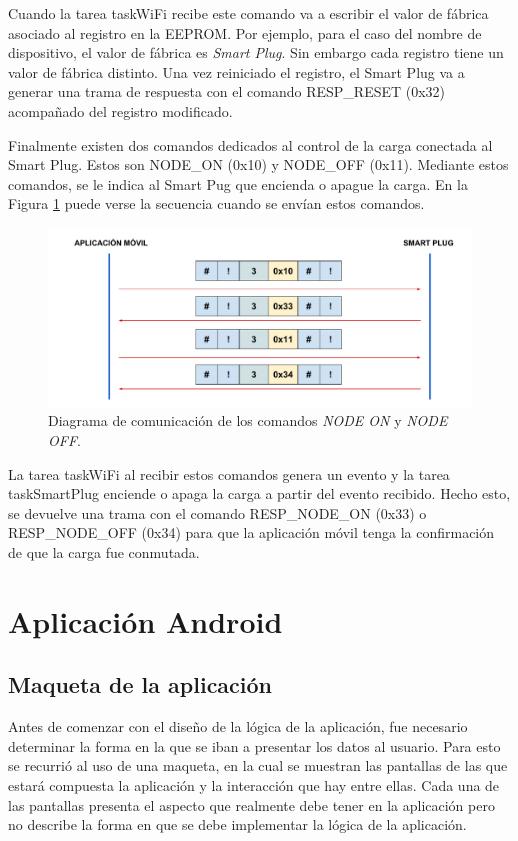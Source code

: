 Cuando la tarea taskWiFi recibe este comando va a escribir el valor de fábrica asociado al registro en la EEPROM. Por ejemplo, para el caso del nombre de dispositivo, el valor de fábrica es \textit{Smart Plug}. Sin embargo cada registro tiene un valor de fábrica distinto. Una vez reiniciado el registro, el Smart Plug va a generar una trama de respuesta con el comando RESP\_RESET (0x32) acompañado del registro modificado.

Finalmente existen dos comandos dedicados al control de la carga conectada al Smart Plug. Estos son NODE\_ON (0x10) y NODE\_OFF (0x11). Mediante estos comandos, se le indica al Smart Pug que encienda o apague la carga. En la Figura \ref{fig:comunicacion_node} puede verse la secuencia cuando se envían estos comandos.

\begin{figure}[h]
	\centering
	\includegraphics[width=14cm]{./Figures/3_2_5_comunicacion_NODE.pdf}
	\caption{Diagrama de comunicación de los comandos \textit{NODE ON} y \textit{NODE OFF}.}
	\label{fig:comunicacion_node}
\end{figure}

La tarea taskWiFi al recibir estos comandos genera un evento y la tarea taskSmartPlug enciende o apaga la carga a partir del evento recibido. Hecho esto, se devuelve una trama con el comando RESP\_NODE\_ON (0x33) o RESP\_NODE\_OFF (0x34) para que la aplicación móvil tenga la confirmación de que la carga fue conmutada.


\section{Aplicación Android}
\label{section:app}

\subsection{Maqueta de la aplicación}

Antes de comenzar con el diseño de la lógica de la aplicación, fue necesario determinar la forma en la que se iban a presentar los datos al usuario. Para esto se recurrió al uso de una maqueta, en la cual se muestran las pantallas de las que estará compuesta la aplicación y la interacción que hay entre ellas. Cada una de las pantallas presenta el aspecto que realmente debe tener en la aplicación pero no describe la forma en que se debe implementar la lógica de la aplicación.

